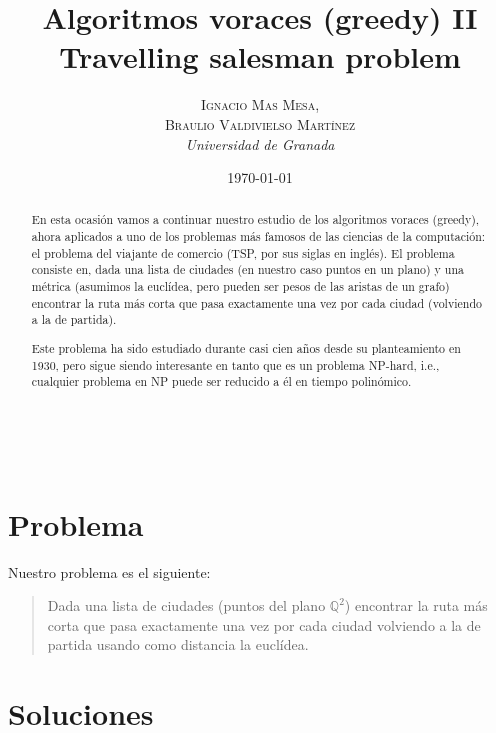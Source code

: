 \documentclass[a4paper, 11pt]{article}
\title{\textbf{Algoritmos voraces (greedy) II}\\ %
Travelling salesman problem} %
\author{\textsc{Ignacio Mas Mesa,\\Braulio Valdivielso Martínez} %
\\{\textit{Universidad de Granada}}} %
\date{\today} %
\makeatletter
\renewcommand{\maketitle}{
  \begin{flushright} %
  
  {\LARGE\@title} %
  
  \vspace{50pt} %
  
  {\large\@author} %
  \\\@date %
  \vspace{40pt} %
  \end{flushright}
}
\makeatother
\begin{document}
\maketitle %

\renewcommand{\abstractname}{Abstract} %
\begin{abstract}
En esta ocasión vamos a continuar nuestro estudio de los algoritmos voraces (greedy), ahora aplicados a uno de los problemas más famosos de las ciencias de la computación: el problema del viajante de comercio (TSP, por sus siglas en inglés). El problema consiste en, dada una lista de ciudades (en nuestro caso puntos en un plano) y una métrica (asumimos la euclídea, pero pueden ser pesos de las aristas de un grafo) encontrar la ruta más corta que pasa exactamente una vez por cada ciudad (volviendo a la de partida).

Este problema ha sido estudiado durante casi cien años desde su planteamiento en 1930, pero sigue siendo interesante en tanto que es un problema NP-hard, i.e., cualquier problema en NP puede ser reducido a él en tiempo polinómico.
\end{abstract}

\vspace{30pt} %


  \tableofcontents

\pagebreak


\section{Problema}
Nuestro problema es el siguiente:
\begin{quote}
Dada una lista de ciudades (puntos del plano ${\mathbb Q}^2$) encontrar la ruta más corta que pasa exactamente una vez por cada ciudad volviendo a la de partida usando como distancia la euclídea.
\end{quote}

\section{Soluciones}
\end{document}
